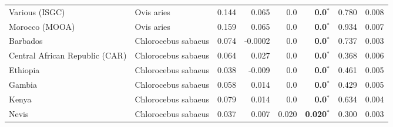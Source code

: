 \begin{center}
\begin{adjustbox}{width = 1\textwidth}
\begin{tabular}{|l|l|r|r|r|r|r|r|}
                 Various (ISGC) &           Ovis aries &                                              0.144 &                                              0.065 &              0.0 &                    \textbf{0.0}$\bm{^*}$ &                                              0.780 &              0.008 \\
                 Morocco (MOOA) &           Ovis aries &                                              0.159 &                                              0.065 &              0.0 &                    \textbf{0.0}$\bm{^*}$ &                                              0.934 &              0.007 \\
                       Barbados &  Chlorocebus sabaeus &                                              0.074 &                                            -0.0002 &              0.0 &                    \textbf{0.0}$\bm{^*}$ &                                              0.737 &              0.003 \\
 Central African Republic (CAR) &  Chlorocebus sabaeus &                                              0.064 &                                              0.027 &              0.0 &                    \textbf{0.0}$\bm{^*}$ &                                              0.368 &              0.006 \\
                       Ethiopia &  Chlorocebus sabaeus &                                              0.038 &                                             -0.009 &              0.0 &                    \textbf{0.0}$\bm{^*}$ &                                              0.461 &              0.005 \\
                         Gambia &  Chlorocebus sabaeus &                                              0.058 &                                              0.014 &              0.0 &                    \textbf{0.0}$\bm{^*}$ &                                              0.429 &              0.005 \\
                          Kenya &  Chlorocebus sabaeus &                                              0.079 &                                              0.014 &              0.0 &                    \textbf{0.0}$\bm{^*}$ &                                              0.634 &              0.004 \\
                          Nevis &  Chlorocebus sabaeus &                                              0.037 &                                              0.007 &            0.020 &                  \textbf{0.020}$\bm{^*}$ &                                              0.300 &              0.003 \\

\end{tabular}
\end{adjustbox}
\end{center}

